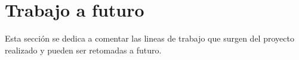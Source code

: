 











\section{Trabajo a futuro}

Esta sección se dedica a comentar las lineas de trabajo que surgen del proyecto
realizado y pueden ser retomadas a futuro.

